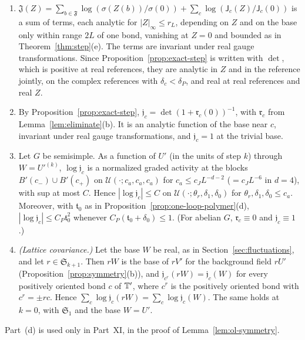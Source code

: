 \begin{proposition}[Jacobians]\label{prop:jacobians}
\begin{enumerate}[label=(\alph*)]
\item $\mathfrak J(Z)=\sum_{b\in\mathfrak F}\log(\sigma(Z(b))/\sigma(0))+\sum_c\log(\mathsf J_c(Z)/\mathsf J_c(0))$ is a sum of terms, each analytic for $|Z|_\infty\le r_L$, depending on $Z$ and on the base only within range $2L$ of one bond, vanishing at $Z=0$ and bounded as in Theorem~\ref{thm:step}(e). The terms are invariant under real gauge transformations. Since Proposition~\ref{prop:exact-step} is written with $\det$, which is positive at real references, they are analytic in $Z$ and in the reference jointly, on the complex references with $\delta_c<\delta_P$, and real at real references and real $Z$.
\item By Proposition~\ref{prop:exact-step}, $\mathfrak j_c=\det(1+\mathfrak r_c(0))^{-1}$, with $\mathfrak r_c$ from Lemma~\ref{lem:eliminate}(b). It is an analytic function of the base near $c$, invariant under real gauge transformations, and $\mathfrak j_c=1$ at the trivial base.
\item Let $G$ be semisimple. As a function of $U'$ (in the units of step $k$) through $W=U'^{(k)}$, $\log\mathfrak j_c$ is a normalized graded activity at the blocks $B'(c_-)\cup B'(c_+)$ on $\mathcal U(\cdot;c_a,c_a,c_a)$ for $c_a\le c_JL^{-d-2}$ ($=c_JL^{-6}$ in $d=4$), with sup at most $C$. Hence $|\log\mathfrak j_c|\le C$ on $\mathcal U(\cdot;\theta_r,\delta_1,\delta_0)$ for $\theta_r,\delta_1,\delta_0\le c_a$. Moreover, with $\mathfrak t_0$ as in Proposition~\ref{prop:one-loop-polymer}(d), $|\log\mathfrak j_c|\le C_P\mathfrak t_0^2$ whenever $C_P(\mathfrak t_0+\delta_0)\le1$. (For abelian $G$, $\mathfrak r_c\equiv0$ and $\mathfrak j_c\equiv1$.)
\item \emph{(Lattice covariance.)} Let the base $W$ be real, as in Section~\ref{sec:fluctuations}, and let $r\in\mathfrak S_{k+1}$. Then $rW$ is the base of $rV'$ for the background field $rU'$ (Proposition~\ref{prop:symmetry}(b)), and $\mathfrak j_{c^r}(rW)=\mathfrak j_c(W)$ for every positively oriented bond $c$ of $\mathbb T'$, where $c^r$ is the positively oriented bond with $c^r=\pm rc$. Hence $\sum_c\log\mathfrak j_c(rW)=\sum_c\log\mathfrak j_c(W)$. The same holds at $k=0$, with $\mathfrak S_1$ and the base $W=U'$.
\end{enumerate}
\end{proposition}
Part~(d) is used only in Part~XI, in the proof of Lemma~\ref{lem:ol-symmetry}.

